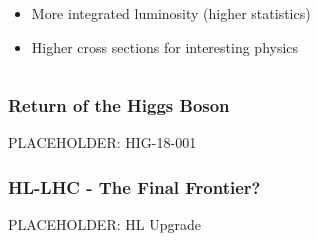 \documentclass[xcolor={usenames,dvipsnames,svgnames,table}]{beamer}
\begin{document}
\begin{frame}
\begin{columns}
\begin{column}{0.49\textwidth}
\begin{figure}[t]
		\end{figure}
		\begin{itemize}
			\item More integrated luminosity (higher statistics)
			\item Higher cross sections for interesting physics
		\end{itemize}
	\end{column}
	\end{columns}
\end{frame}

\begin{frame}
	\frametitle{Return of the Higgs Boson}
	PLACEHOLDER: HIG-18-001
\end{frame}

\begin{frame}
	\frametitle{HL-LHC - The Final Frontier?}
	PLACEHOLDER: HL Upgrade
\end{frame}
\end{document}
